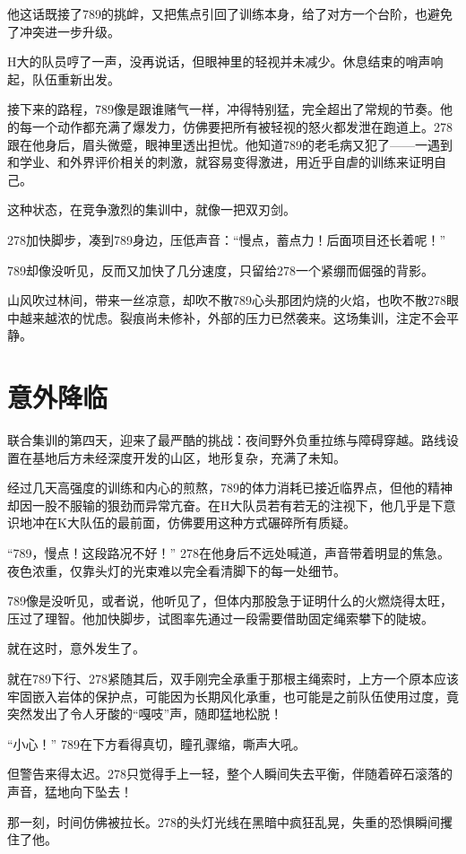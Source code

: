 \documentclass[a4paper]{book}
\begin{document}
他这话既接了789的挑衅，又把焦点引回了训练本身，给了对方一个台阶，也避免了冲突进一步升级。

H大的队员哼了一声，没再说话，但眼神里的轻视并未减少。休息结束的哨声响起，队伍重新出发。

接下来的路程，789像是跟谁赌气一样，冲得特别猛，完全超出了常规的节奏。他的每一个动作都充满了爆发力，仿佛要把所有被轻视的怒火都发泄在跑道上。278跟在他身后，眉头微蹙，眼神里透出担忧。他知道789的老毛病又犯了——一遇到和学业、和外界评价相关的刺激，就容易变得激进，用近乎自虐的训练来证明自己。

这种状态，在竞争激烈的集训中，就像一把双刃剑。

278加快脚步，凑到789身边，压低声音：“慢点，蓄点力！后面项目还长着呢！”

789却像没听见，反而又加快了几分速度，只留给278一个紧绷而倔强的背影。

山风吹过林间，带来一丝凉意，却吹不散789心头那团灼烧的火焰，也吹不散278眼中越来越浓的忧虑。裂痕尚未修补，外部的压力已然袭来。这场集训，注定不会平静。
\normalsize
\section{意外降临}  
\songti{}
联合集训的第四天，迎来了最严酷的挑战：夜间野外负重拉练与障碍穿越。路线设置在基地后方未经深度开发的山区，地形复杂，充满了未知。

经过几天高强度的训练和内心的煎熬，789的体力消耗已接近临界点，但他的精神却因一股不服输的狠劲而异常亢奋。在H大队员若有若无的注视下，他几乎是下意识地冲在K大队伍的最前面，仿佛要用这种方式碾碎所有质疑。

“789，慢点！这段路况不好！” 278在他身后不远处喊道，声音带着明显的焦急。夜色浓重，仅靠头灯的光束难以完全看清脚下的每一处细节。

789像是没听见，或者说，他听见了，但体内那股急于证明什么的火燃烧得太旺，压过了理智。他加快脚步，试图率先通过一段需要借助固定绳索攀下的陡坡。

就在这时，意外发生了。

就在789下行、278紧随其后，双手刚完全承重于那根主绳索时，上方一个原本应该牢固嵌入岩体的保护点，可能因为长期风化承重，也可能是之前队伍使用过度，竟突然发出了令人牙酸的“嘎吱”声，随即猛地松脱！

“小心！” 789在下方看得真切，瞳孔骤缩，嘶声大吼。

但警告来得太迟。278只觉得手上一轻，整个人瞬间失去平衡，伴随着碎石滚落的声音，猛地向下坠去！

那一刻，时间仿佛被拉长。278的头灯光线在黑暗中疯狂乱晃，失重的恐惧瞬间攫住了他。
\end{document}
